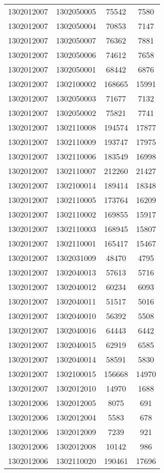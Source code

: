 \begin{longtable}[h]{llcc}
		1302012007 & 1302050005 & 75542 & 7580\\
		1302012007 & 1302050004 & 70853 & 7147\\
		1302012007 & 1302050007 & 76362 & 7881\\
		1302012007 & 1302050006 & 74612 & 7658\\
		1302012007 & 1302050001 & 68442 & 6876\\
		1302012007 & 1302100002 & 168665 & 15991\\
		1302012007 & 1302050003 & 71677 & 7132\\
		1302012007 & 1302050002 & 75821 & 7741\\
		1302012007 & 1302110008 & 194574 & 17877\\
		1302012007 & 1302110009 & 193747 & 17975\\
		1302012007 & 1302110006 & 183549 & 16998\\
		1302012007 & 1302110007 & 212260 & 21427\\
		1302012007 & 1302100014 & 189414 & 18348\\
		1302012007 & 1302110005 & 173764 & 16209\\
		1302012007 & 1302110002 & 169855 & 15917\\
		1302012007 & 1302110003 & 168945 & 15807\\
		1302012007 & 1302110001 & 165417 & 15467\\
		1302012007 & 1302031009 & 48470 & 4795\\
		1302012007 & 1302040013 & 57613 & 5716\\
		1302012007 & 1302040012 & 60234 & 6093\\
		1302012007 & 1302040011 & 51517 & 5016\\
		1302012007 & 1302040010 & 56392 & 5508\\
		1302012007 & 1302040016 & 64443 & 6442\\
		1302012007 & 1302040015 & 62919 & 6585\\
		1302012007 & 1302040014 & 58591 & 5830\\
		1302012007 & 1302100015 & 156668 & 14970\\
		1302012007 & 1302012010 & 14970 & 1688\\
		1302012006 & 1302012005 & 8075 & 691\\
		1302012006 & 1302012004 & 5583 & 678\\
		1302012006 & 1302012009 & 7239 & 921\\
		1302012006 & 1302012008 & 10142 & 986\\
		1302012006 & 1302110020 & 190461 & 17696\\

\end{longtable}
